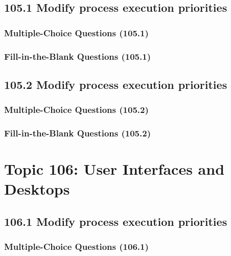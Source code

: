 \documentclass[a4paper]{report}
\begin{document}
\subsection*{105.1 Modify process execution priorities}
\subsubsection*{Multiple-Choice Questions (105.1)}

\subsubsection*{Fill-in-the-Blank Questions (105.1)}

\subsection*{105.2 Modify process execution priorities}
\subsubsection*{Multiple-Choice Questions (105.2)}

\subsubsection*{Fill-in-the-Blank Questions (105.2)}


\section*{Topic 106: User Interfaces and Desktops}

\subsection*{106.1 Modify process execution priorities}
\subsubsection*{Multiple-Choice Questions (106.1)}
\end{document}
